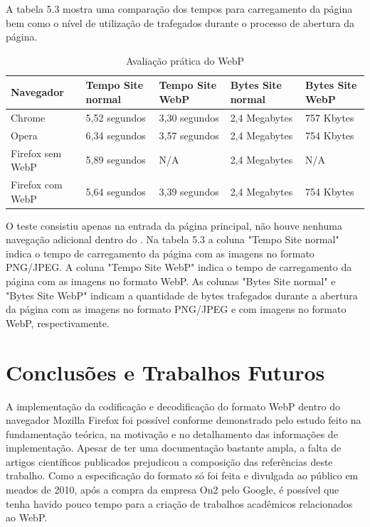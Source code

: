 \documentclass[espaco=simples,appendix=Name]{abnt}
\begin{document}
A tabela 5.3 mostra uma comparação dos tempos para carregamento da página bem como o nível de utilização de  trafegados durante o processo de abertura da página.

\begin{table}[ht]
        \centering
        \caption{Avaliação prática do WebP
        \label{tbl:padc}}{
                \begin{tabular}{|l|p{3cm}|p{3cm}|l|p{2cm}|}
                \hline
                        \textbf{Navegador} & \textbf{Tempo Site normal} & \textbf{Tempo Site WebP} & \textbf{Bytes Site normal} & \textbf{Bytes Site WebP} \\
                        \hline
                        Chrome			&  5,52 segundos	& 3,30 segundos		& 2,4 Megabytes		& 757 Kbytes \\
                        \hline
						Opera			&  6,34 segundos	& 3,57 segundos		& 2,4 Megabytes		& 754 Kbytes \\
						\hline
                        Firefox sem WebP	&  5,89 segundos	& N/A			& 2,4 Megabytes		& N/A \\
                        \hline
                        Firefox com WebP	&  5,64 segundos	& 3,39 segundos		& 2,4 Megabytes		& 754 Kbytes \\
                        \hline
                \end{tabular}
                }
\end{table}

O teste consistiu apenas na entrada da página principal, não houve nenhuma navegação adicional dentro do . Na tabela 5.3 a coluna "Tempo Site normal" indica o tempo de carregamento da página com as imagens no formato PNG/JPEG. A coluna "Tempo Site WebP" indica o tempo de carregamento da página com as imagens no formato WebP. As colunas "Bytes Site normal" e "Bytes Site WebP" indicam a quantidade de bytes trafegados durante a abertura da página com as imagens no formato PNG/JPEG e com imagens no formato WebP, respectivamente.

\chapter{Conclusões e Trabalhos Futuros}

A implementação da codificação e decodificação do formato WebP dentro do navegador Mozilla Firefox foi possível conforme demonstrado pelo estudo feito na fundamentação teórica, na motivação e no detalhamento das informações de implementação. Apesar de ter uma documentação bastante ampla, a falta de artigos científicos publicados prejudicou a composição das referências deste trabalho. Como a especificação do formato só foi feita e divulgada ao público em meados de 2010, após a compra da empresa On2 pelo Google, é possível que tenha havido pouco tempo para a criação de trabalhos acadêmicos relacionados ao WebP.
\end{document}
